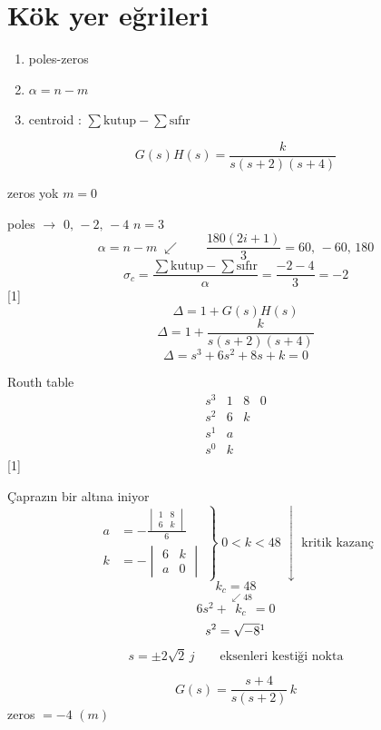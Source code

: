 \documentclass[11pt,a4paper]{article}
\begin{document}

\section{Kök yer eğrileri}
\begin{enumerate}[label=\arabic*)]
  \item poles-zeros
  \item $\alpha = n-m$
  \item centroid : $\sum \text{kutup} - \sum \text{sıfır}$
\end{enumerate}
\[ G(s)H(s) = \frac{k}{s(s+2)(s+4)} \]

zeros yok \quad $m=0$

poles $\rightarrow$ $0,\,-2,\,-4$ \quad $n=3$
\[ \alpha = n-m \;\swarrow \qquad \frac{180(2i+1)}{3} = 60,\,-60,\,180 \]
\[ \sigma_c = \frac{\sum \text{kutup} - \sum \text{sıfır}}{\alpha} = \frac{-2-4}{3} = -2 \]
[1]
\[ \Delta = 1 + G(s)H(s) \]
\[ \Delta = 1 + \frac{k}{s(s+2)(s+4)} \]
\[ \Delta = s^3 + 6s^2 + 8s + k = 0 \]

Routh table
\[ \begin{array}{c|ccc} s^3 & 1 & 8 & 0\\ s^2 & 6 & k & \\ s^1 & a & & \\ s^0 & k & & \end{array} \]
[1]

Çaprazın bir altına iniyor
\[ \left.\begin{aligned} a &= -\frac{\begin{vmatrix} 1 & 8\\ 6 & k\end{vmatrix}}{6}\\[2mm] k &= -\begin{vmatrix} 6 & k\\ a & 0\end{vmatrix}\end{aligned}\right\} \; 0<k<48 \;\downarrow\; \text{kritik kazanç} \]
\[ k_c = 48 \]
\[ 6s^2 + \overset{\swarrow 48}{k_c} = 0 \]
\[ s^2 = \sqrt{-8}\footnotemark \]
\[ s = \pm 2\sqrt{2}\,j \qquad \text{eksenleri kestiği nokta} \]

\[ G(s) = \frac{s+4}{s(s+2)}\,k \]
zeros $=-4$ \quad $(m)$
\end{document}

